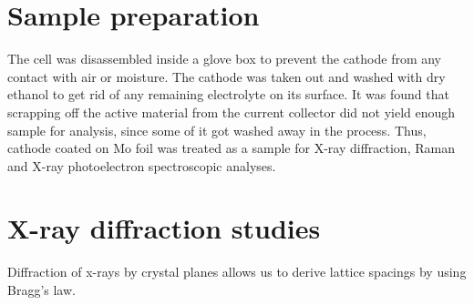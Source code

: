 \section*{Sample preparation}
The cell was disassembled inside a glove box to prevent the cathode from any contact with air or moisture. The cathode was taken out and washed with dry ethanol to get rid of any remaining electrolyte on its surface. It was found that scrapping off the active material from the current collector did not yield enough sample for analysis, since some of it got washed away in the process. Thus, cathode coated on Mo foil was treated as a sample for X-ray diffraction, Raman and X-ray photoelectron spectroscopic analyses.

\section{X-ray diffraction studies}
Diffraction of x-rays by crystal planes allows us to derive lattice spacings by using Bragg's law. 

